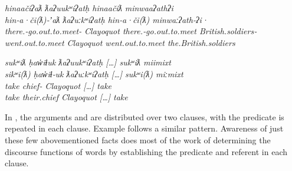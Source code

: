 \begin{exe}

  \ex\label{ex:3.4}

  \begin{xlist}

    \renewcommand{\eachwordfour}{\rule[-10pt]{0pt}{0pt}\rmfamily}

    \ex\label{ex:3.4a}
    \gllll \em{hinaačiʔaƛ}                            ƛaʔuukʷiʔatḥ \em{hinaačiƛ}                      minwaaʔathʔi\\
           \em{hin‑a·či(ƛ)‑ʼaƛ}                        ƛaʔuːkʷiʔatḥ \em{hin‑a·či(ƛ)}                   minwaːʔath‑ʔi·\\
           \em{there.‑go.out.to.meet‑} Clayoquot    \em{there.‑go.out.to.meet} British.soldiers‑\\
           \em{went.out.to.meet}                      Clayoquot    \em{went.out.to.meet}              the.British.soldiers\\

    \renewcommand{\eachwordfour}{\rmfamily}

    \ex\label{ex:3.4b}
    \gllll \em{sukʷiƛ}   ḥaw̓iɬuk         ƛaʔuukʷiʔatḥ […] \em{sukʷiƛ}   miimixt\\
           \em{sikʷi(ƛ)} ḥaw̓iɬ‑uk        ƛaʔuːkʷiʔatḥ […] \em{sukʷi(ƛ)} miːmixt\\
           \em{take}     chief‑ Clayoquot    […] \em{take}     \\
           \em{take}     their.chief     Clayoquot    […] \em{take}     \\

  \end{xlist}

\end{exe}

\noindent In , the arguments   and   are distributed over two clauses, with the predicate  is repeated in each clause. Example  follows a similar pattern. Awareness of just these few abovementioned facts does most of the work of determining the discourse functions of words by establishing the predicate and referent in each clause.

